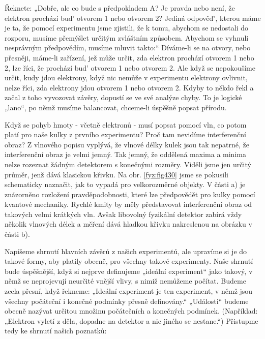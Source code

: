     Řeknete: „Dobře, ale co bude s předpokladem A? Je pravda nebo není, že elektron prochází bud'
    otvorem 1 nebo otvorem 2? Jediná odpověď', kterou máme je ta, že pomocí experimentu jsme
    zjistili, že k tomu, abychom se nedostali do rozporu, musíme přemýšlet určitým zvláštním
    způsobem. Abychom se vyhnuli nesprávným předpovědím, musíme mluvit takto:“ Díváme-li se na
    otvory, nebo přesněji, máme-li zařízení, jež může určit, zda elektron prochází otvorem 1 nebo 2,
    lze říci, že prochází bud' otvorem 1 nebo otvorem 2. Ale když se nepokoušíme určit, kudy jdou
    elektrony, když nic nemůže v experimentu elektrony ovlivnit, nelze říci, zda elektrony jdou
    otvorem 1 nebo otvorem 2. Kdyby to někdo řekl a začal z toho vyvozovat závěry, dopustí se ve své
    analýze chyby. To je logické „lano“, po němž musíme balancovat, chceme-li úspěšně popsat
    přírodu.

    Když se pohyb hmoty - včetně elektronů - musí popsat pomocí vln, co potom platí pro naše kulky z
    prvního experimentu? Proč tam nevidíme interferenční obraz? Z vlnového popisu vyplývá, že vlnové
    délky kulek jsou tak nepatrné, že interferenční obraz je velmi jemný. Tak jemný, že oddělená
    maxima a minima nelze rozeznat žádným detektorem s konečnými rozměry. Viděli jsme jen určitý
    průměr, jenž dává klasickou křivku. Na obr. \ref{fyz:fig430} jsme se pokusili schematicky
    naznačit, jak to vypadá pro velkorozměrné objekty. V části a) je znázorněno rozložení
    pravděpodobnosti, které lze předpovědět pro kulky pomocí kvantové mechaniky. Rychlé kmity by
    měly představovat interferenční obraz od takových velmi krátkých vln. Avšak libovolný fyzikální
    detektor zabírá vždy několik vlnových délek a měření dává hladkou křivku nakreslenou na obrázku
    v části b).

    Napíšeme shrnutí hlavních závěrů z našich experimentů, ale upravíme si je do takové formy, aby
    platily obecně, pro všechny takové experimenty. Naše shrnutí bude úspěšnější, když si nejprve
    definujeme „ideální experiment“ jako takový, v němž se neprojevují neurčité vnější vlivy, s
    nimiž nemůžeme počítat. Budeme zcela přesní, když řekneme: „Ideální experiment je ten
    experiment, v němž jsou všechny počáteční i konečné podmínky přesně definovány.“ „Události“
    budeme obecně nazývat určitou množinu počátečních a konečných podmínek. (Například: „Elektron
    vyletí z děla, dopadne na detektor a nic jiného se nestane.“) Přistupme tedy ke shrnutí našich
    poznatků:
        
